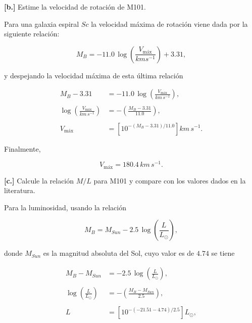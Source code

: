\documentclass[paper=a4, fontsize=10pt]{scrartcl} %
\begin{document}
\vspace{0.4cm} 


{\bf{[b.]}} Estime la velocidad de rotación de M101.

Para una galaxia espiral $Sc$ la velocidad máxima de rotación viene dada por la siguiente relación: 

\begin{equation} \label{eq:1.3}
M_B = -11.0 \, \log \left(\frac{V_{\text{máx}}}{kms^{-1}} \right) + 3.31,
\end{equation}

y despejando la velocidad máxima de esta última relación 

\begin{align*}
M_B - 3.31 & = -11.0 \, \log \left(\frac{V_{\text{máx}}}{km \,s^{-1}} \right), \\
\\
\log \left(\frac{V_{\text{máx}}}{km \, s^{-1}} \right) & = - \left(\frac{M_B - 3.31}{11.0} \right), \\
\\
V_{\text{máx}} & = \left[ 10^{-(M_B -3.31)/11.0} \right] km \, s^{-1}.
\end{align*}

Finalmente, 

\begin{equation} \label{eq:1.4}
V_{\text{máx}} = 180.4 \, km\, s^{-1}. 
\end{equation}
\vspace{0.3cm} 

{\bf{[c.]}} Calcule la relación $M/L$ para M101 y compare con los valores dados en la literatura.

Para la luminosidad, usando la relación

\begin{equation} \label{eq:1.5}
M_B = M_{Sun} - 2.5 \, \log \left(\frac{L}{L_{\odot}} \right),
\end{equation}

donde $M_{Sun}$ es la magnitud absoluta del Sol, cuyo valor es de $4.74$ se tiene 

\begin{align*}
M_B - M_{Sun} & = -2.5 \, \log \left(\frac{L}{L_{\odot}} \right),\\
\\
\log \left(\frac{L}{L_{\odot}} \right) &= - \left(\frac{M_B - M_{Sun}}{2.5} \right), \\
\\
L & = \left[ 10^{-(-21.51 - 4.74)/2.5} \right] L_{\odot},
\end{align*}
\end{document}
